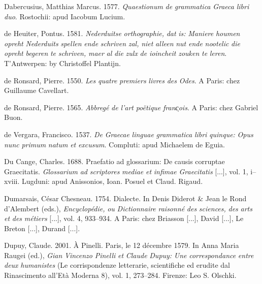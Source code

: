 \documentclass[output=paper]{langsci/langscibook}
\begin{document}
Dabercusius, Matthias Marcus. 1577. \textit{Quaestionum} \textit{de} \textit{grammatica} \textit{Graeca} \textit{libri} \textit{duo}. Rostochii: apud Iacobum Lucium.

de Heuiter, Pontus. 1581. \textit{Nederduitse} \textit{orthographie,} \textit{dat} \textit{is:} \textit{Maniere} \textit{houmen} \textit{opreht} \textit{Nederduits} \textit{spellen} \textit{ende} \textit{schriven} \textit{zal,} \textit{niet} \textit{alleen} \textit{nut} \textit{ende} \textit{nootelic} \textit{die} \textit{opreht} \textit{begeren} \textit{te} \textit{schriven,} \textit{maer} \textit{al} \textit{die} \textit{zulx} \textit{de} \textit{ioincheit} \textit{zouken} \textit{te} \textit{leren}. T’Antwerpen: by Christoffel Plantijn.

de Ronsard, Pierre. 1550. \textit{Les} \textit{quatre} \textit{premiers} \textit{livres} \textit{des} \textit{Odes}. A Paris: chez Guillaume Cavellart.

de Ronsard, Pierre. 1565. \textit{Abbregé} \textit{de} \textit{l’art} \textit{poëtique} \textit{franc̜ois}. A Paris: chez Gabriel Buon.

de Vergara, Francisco. 1537. \textit{De} \textit{Graecae} \textit{linguae} \textit{grammatica} \textit{libri} \textit{quinque:} \textit{Opus} \textit{nunc} \textit{primum} \textit{natum} \textit{et} \textit{excusum}. Compluti: apud Michaelem de Eguia.

Du Cange, Charles. 1688. Praefatio ad glossarium: De causis corruptae Graecitatis. \textit{Glossarium} \textit{ad} \textit{scriptores} \textit{mediae} \textit{et} \textit{infimae} \textit{Graecitatis} [...], vol. 1, i–xviii. Lugduni: apud Anissonios, Ioan. Posuel et Claud. Rigaud.

Dumarsais, César Chesneau. 1754. Dialecte. In Denis Diderot \& Jean le Rond d’Alembert (eds.), \textit{Encyclopédie,} \textit{ou} \textit{Dictionnaire} \textit{raisonné} \textit{des} \textit{sciences,} \textit{des} \textit{arts} \textit{et} \textit{des} \textit{métiers} [...], vol. 4, 933–934. A Paris: chez Briasson [...], David [...], Le Breton [...], Durand [...].

Dupuy, Claude. 2001. À Pinelli. Paris, le 12 décembre 1579. In Anna Maria Raugei (ed.), \textit{Gian} \textit{Vincenzo} \textit{Pinelli} \textit{et} \textit{Claude} \textit{Dupuy:} \textit{Une} \textit{correspondance} \textit{entre} \textit{deux} \textit{humanistes} (Le corrispondenze letterarie, scientifiche ed erudite dal Rinascimento all’Età Moderna 8), vol. 1, 273–284. Firenze: Leo S. Olschki.
\end{document}
